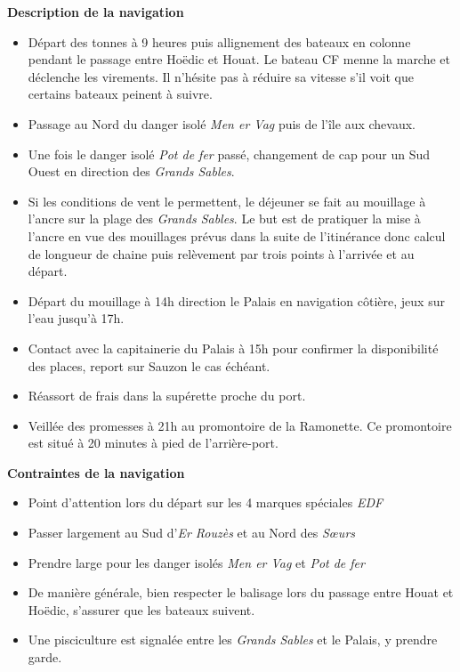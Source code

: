 \begin{minipage}[c][\textheight][t]{0.10\textwidth}
\hfill
\end{minipage}%
\begin{minipage}[c][\textheight][t]{0.50\textwidth}
    \vspace{2.5cm}
    \color{StrongBlue}    
    {\huge \textbf{Description de la navigation}}\\
            \begin{itemize}
                \item Départ des tonnes à 9 heures puis allignement des bateaux en colonne pendant le passage entre Hoëdic et Houat. Le bateau CF menne la marche et déclenche les virements. Il n'hésite pas à réduire sa vitesse s'il voit que certains bateaux peinent à suivre.
                \item Passage au Nord du danger isolé \textit{Men er Vag} puis de l'île aux chevaux. 
                \item Une fois le danger isolé \textit{Pot de fer} passé, changement de cap pour un Sud Ouest en direction des \textit{Grands Sables}. 
                \item Si les conditions de vent le permettent, le déjeuner se fait au mouillage à l'ancre sur la plage des \textit{Grands Sables}. Le but est de pratiquer la mise à l'ancre en vue des mouillages prévus dans la suite de l'itinérance donc calcul de longueur de chaine puis relèvement par trois points à l'arrivée et au départ. 
                \item Départ du mouillage à 14h direction le Palais en navigation côtière, jeux sur l'eau jusqu'à 17h. 
                \item Contact avec la capitainerie du Palais à 15h pour confirmer la disponibilité des places, report sur Sauzon le cas échéant. 
                \item Réassort de frais dans la supérette proche du port. 
                \item Veillée des promesses à 21h au promontoire de la Ramonette. Ce promontoire est situé à 20 minutes à pied de l'arrière-port.  
            \end{itemize}
        {
        \huge \textbf{Contraintes de la navigation}}\\
            \begin{itemize}
                \item Point d'attention lors du départ sur les 4 marques spéciales \textit{EDF}
                \item Passer largement au Sud d'\textit{Er Rouzès} et au Nord des \textit{Sœurs}
                \item Prendre large pour les danger isolés \textit{Men er Vag} et \textit{Pot de fer}
                \item De manière générale, bien respecter le balisage lors du passage entre Houat et Hoëdic, s'assurer que les bateaux suivent. 
                \item Une pisciculture est signalée entre les \textit{Grands Sables} et le Palais, y prendre garde.  
            \end{itemize}
\end{minipage}%
